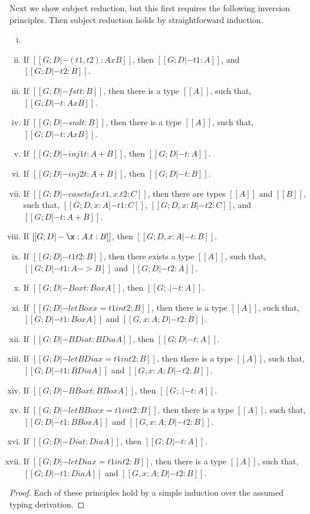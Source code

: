 Next we show subject reduction, but this first requires the following
inversion principles.  Then subject reduction holds by straightforward
induction.
\begin{lemma}[Inversion]
  \label{lemma:inversion}
  \begin{enumerate}[i.]
  \item[]
  \item If $[[G; D |- (t1, t2) : A x B]]$, then $[[G;D |- t1 : A]]$, and $[[G;D |- t2 : B]]$.
  \item If $[[G; D |- fst t : B]]$, then there is a type $[[A]]$, such that, $[[G; D |- t : A x B]]$.
  \item If $[[G; D |- snd t : B]]$, then there is a type $[[A]]$, such that, $[[G; D |- t : A x B]]$.
  \item If $[[G; D |- inj1 t : A + B]]$, then $[[G; D |- t : A]]$.
  \item If $[[G; D |- inj2 t : A + B]]$, then $[[G; D |- t : B]]$.
  \item If $[[G; D |- case t of x.t1,x.t2 : C]]$, then there are types $[[A]]$ and $[[B]]$,
    such that, $[[G;D, x : A |- t1 : C]]$, $[[G;D, x : B |- t2 : C]]$, and $[[G;D |- t : A + B]]$.
  \item If $[[G;D |- \x:A.t : B]]$, then $[[G;D,x : A |- t : B]]$.    
  \item If $[[G;D |- t1 t2 : B]]$, then there exists a type $[[A]]$, such that, $[[G;D |- t1 : A -> B]]$ and $[[G;D |- t2 : A]]$.
  \item If $[[G;D |- Box t : Box A]]$, then $[[G;. |- t : A]]$.
  \item If $[[G;D |- letBox x = t1 in t2 : B]]$, then there is a type $[[A]]$, such that,
    $[[G;D |- t1 : Box A]]$ and $[[G,x : A;D |- t2 : B]]$.
  \item If $[[G;D |- BDia t : BDia A]]$, then $[[G;D |- t : A]]$.
  \item If $[[G;D |- letBDia x = t1 in t2 : B]]$, then there is a type $[[A]]$, such that,
    $[[G;D |- t1 : BDia A]]$ and $[[G,x : A;D |- t2 : B]]$.
  \item If $[[G;D |- BBox t : BBox A]]$, then $[[G;. |- t : A]]$.
  \item If $[[G;D |- letBBox x = t1 in t2 : B]]$, then there is a type $[[A]]$, such that,
    $[[G;D |- t1 : BBox A]]$ and $[[G,x : A;D |- t2 : B]]$.
  \item If $[[G;D |- Dia t : Dia A]]$, then $[[G;D |- t : A]]$.
  \item If $[[G;D |- letDia x = t1 in t2 : B]]$, then there is a type $[[A]]$, such that,
    $[[G;D |- t1 : Dia A]]$ and $[[G,x : A;D |- t2 : B]]$.
  \end{enumerate}
\end{lemma}
\begin{proof}
  Each of these principles hold by a simple induction over the assumed
  typing derivation.
\end{proof}

